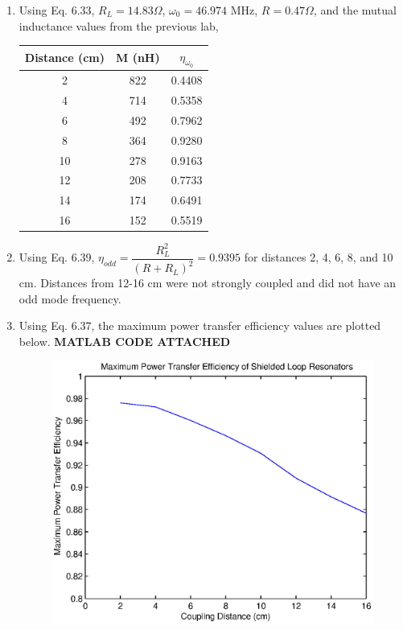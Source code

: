 \documentclass{article}
\begin{document}
\begin{enumerate}
	\item Using Eq. 6.33, $R_L = 14.83\Omega$, $\omega_0 = 46.974$ MHz, $R = 0.47\Omega$, and the mutual inductance values from the previous lab,
	\begin{table}[H]
	\centering
		\begin{tabular}{|c|c|c|}
		\hline
		Distance (cm) & M (nH)& $\eta_{\omega_0}$  \\ \hline
		2             & 822   & 0.4408  \\ \hline
		4             & 714   & 0.5358  \\ \hline
		6             & 492   & 0.7962  \\ \hline
		8             & 364   & 0.9280  \\ \hline
		10            & 278   & 0.9163  \\ \hline
		12            & 208   & 0.7733  \\ \hline
		14            & 174   & 0.6491  \\ \hline
		16            & 152   & 0.5519  \\ \hline
		\end{tabular}
	\end{table}

	\item Using Eq. 6.39, $\eta_{odd} = \dfrac{R_L^2}{(R+R_L)^2} = 0.9395$ for distances 2, 4, 6, 8, and 10 cm. Distances from 12-16 cm were not strongly coupled and did not have an odd mode frequency.
	\item Using Eq. 6.37, the maximum power transfer efficiency values are plotted below. \textbf{MATLAB CODE ATTACHED}
	\begin{figure}[H]
		\centering
   		\includegraphics[scale = 0.85]{./Matlab/Analysis2_1.eps}
	\end{figure}
\end{enumerate}
\end{document}

